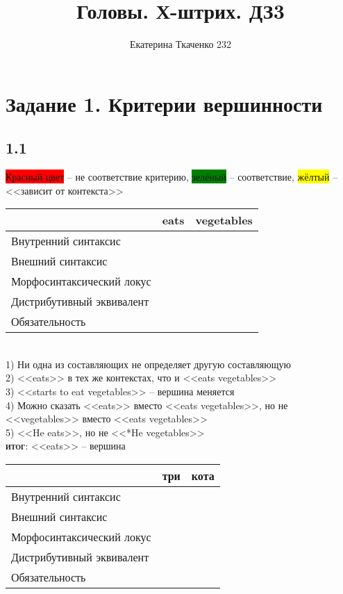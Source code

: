 \documentclass[14pt,extrafontsizes]{article}
\title{Головы. Х-штрих. ДЗ3}
\author{Екатерина Ткаченко 232}
\begin{document}
\maketitle

\section*{Задание 1. Критерии вершинности}
\subsection*{1.1}
\colorbox{red}{Красный цвет} -- не соответствие критерию, \colorbox{green}{зелёный} -- соответствие, \colorbox{yellow}{жёлтый} -- <<зависит от контекста>>\\
    \begin{tabular}{|l|l|l|}
        \hline
         & \textbf{eats} & \textbf{vegetables}\\
         \hline
         Внутренний синтаксис& \cellcolor{red} & \cellcolor{red}\\
         Внешний синтаксис& \cellcolor{green} & \cellcolor{red} \\
         Морфосинтаксический локус& \cellcolor{green} & \cellcolor{red}\\
         Дистрибутивный эквивалент& \cellcolor{green} & \cellcolor{red}\\
         Обязательность& \cellcolor{green} & \cellcolor{red}\\
         \hline
    \end{tabular}
\\
1) Ни одна из составляющих не определяет другую составляющую\\
2) <<eats>> в тех же контекстах, что и <<eats vegetables>>\\
3) <<starts to eat vegetables>> -- вершина меняется\\
4) Можно сказать <<eats>> вместо <<eats vegetables>>, но не <<vegetables>> вместо <<eats vegetables>> \\
5) <<He eats>>, но не <<*He vegetables>> \\
\textsc{\textbf{итог}}: <<eats>> -- вершина\\
    \begin{tabular}{|l|c|c|}
        \hline
         & \textbf{три} & \textbf{кота}\\
         \hline
         Внутренний синтаксис& \cellcolor{green} & \cellcolor{red}\\
         Внешний синтаксис& \cellcolor{green} & \cellcolor{red}\\
         Морфосинтаксический локус& \cellcolor{green} & \cellcolor{yellow}\\
         Дистрибутивный эквивалент& \cellcolor{yellow} & \cellcolor{red} \\
         Обязательность& \cellcolor{green} & \cellcolor{red}\\
         \hline
    \end{tabular}
\end{document}
